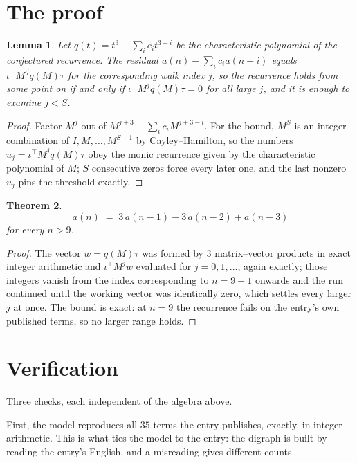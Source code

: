 \documentclass[11pt,a4paper]{article}
\theoremstyle{plain}
\newtheorem{theorem}{Theorem}
\newtheorem{lemma}[theorem]{Lemma}
\theoremstyle{definition}
\begin{document}
\section{The proof}

\begin{lemma}\label{lem:crit}
Let $q(t)=t^{3}-\sum_i c_it^{3-i}$ be the characteristic polynomial of the
conjectured recurrence. The residual $a(n)-\sum_ic_ia(n-i)$ equals
$\iota^{\!\top}M^{\,j}q(M)\tau$ for the corresponding walk index $j$, so the recurrence
holds from some point on if and only if $\iota^{\!\top}M^{j}q(M)\tau=0$ for all large $j$,
and it is enough to examine $j<S$.
\end{lemma}

\begin{proof}
Factor $M^{j}$ out of $M^{j+3}-\sum_ic_iM^{j+3-i}$. For the bound, $M^{S}$
is an integer combination of $I,M,\dots,M^{S-1}$ by Cayley--Hamilton, so the numbers
$u_j=\iota^{\!\top}M^{j}q(M)\tau$ obey the monic recurrence given by the characteristic
polynomial of $M$; $S$ consecutive zeros force every later one, and the last nonzero $u_j$
pins the threshold exactly.
\end{proof}

\begin{theorem}
\[
a(n)\;=\;3\,a(n-1) - 3\,a(n-2) + a(n-3)
\]
for every $n>9$.
\end{theorem}

\begin{proof}
The vector $w=q(M)\tau$ was formed by $3$ matrix--vector products in exact integer
arithmetic and $\iota^{\!\top}M^{j}w$ evaluated for $j=0,1,\dots$, again exactly; those
integers vanish from the index corresponding to $n=9+1$ onwards and the run continued
until the working vector was identically zero, which settles every larger $j$ at once. The bound is exact: at $n=9$ the recurrence fails on the entry's own published terms, so no larger range holds.
\end{proof}

\section{Verification}

Three checks, each independent of the algebra above.

First, the model reproduces all $35$ terms the entry publishes, exactly, in integer
arithmetic. This is what ties the model to the entry: the digraph is built by reading the
entry's English, and a misreading gives different counts.
\end{document}
